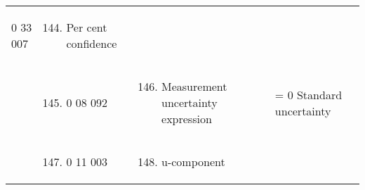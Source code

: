 \begin{longtable}[]{@{}llll@{}}
\begin{minipage}[t]{0.22\columnwidth}
\begin{enumerate}
  0 33 007
\end{enumerate}\strut
\end{minipage} & \begin{minipage}[t]{0.22\columnwidth}\raggedright
\begin{enumerate}
\setcounter{enumi}{143}
\item
  Per cent confidence
\end{enumerate}\strut
\end{minipage} & \begin{minipage}[t]{0.22\columnwidth}\raggedright
\strut
\end{minipage}\tabularnewline
\begin{minipage}[t]{0.22\columnwidth}\raggedright
\strut
\end{minipage} & \begin{minipage}[t]{0.22\columnwidth}\raggedright
\begin{enumerate}
\setcounter{enumi}{144}
\item
  0 08 092
\end{enumerate}\strut
\end{minipage} & \begin{minipage}[t]{0.22\columnwidth}\raggedright
\begin{enumerate}
\setcounter{enumi}{145}
\item
  Measurement uncertainty expression
\end{enumerate}\strut
\end{minipage} & \begin{minipage}[t]{0.22\columnwidth}\raggedright
= 0 Standard uncertainty\strut
\end{minipage}\tabularnewline
\begin{minipage}[t]{0.22\columnwidth}\raggedright
\strut
\end{minipage} & \begin{minipage}[t]{0.22\columnwidth}\raggedright
\begin{enumerate}
\setcounter{enumi}{146}
\item
  0 11 003
\end{enumerate}\strut
\end{minipage} & \begin{minipage}[t]{0.22\columnwidth}\raggedright
\begin{enumerate}
\setcounter{enumi}{147}
\item
  u-component
\end{enumerate}\strut
\end{minipage} & \begin{minipage}[t]{0.22\columnwidth}\raggedright

\end{minipage}
\end{longtable}

